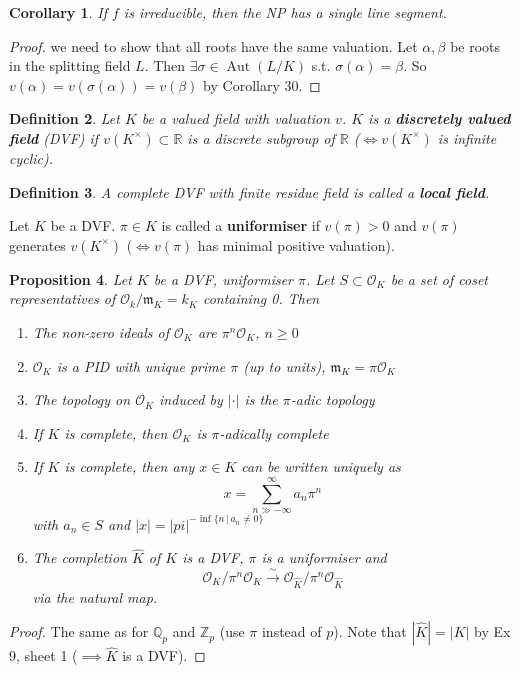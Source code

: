\documentclass[a4paper]{article}
\newtheorem{definition}{Definition}
\newtheorem{prop}[definition]{Proposition}
\newtheorem{corollary}[definition]{Corollary}
\newcommand*\abs[1]{\left|#1\right|}
\DeclareMathOperator{\Aut}{Aut}
\begin{document}
\begin{corollary}
	If $f$ is irreducible, then the NP has a single line segment.
\end{corollary}
\begin{proof}
	we need to show that all roots have the same valuation. Let $\alpha, \beta$ be roots in the splitting field $L$. Then $\exists \sigma \in \Aut(L/K)$ s.t. $\sigma(\alpha) = \beta$. So $v(\alpha)=v(\sigma(\alpha))=v(\beta)$ by Corollary 30.
\end{proof}

\begin{definition}
	Let $K$ be a valued field with valuation $v$. $K$ is a \textbf{discretely valued field} (DVF) if $v(K^\times)\subset \mathbb{R}$ is a discrete subgroup of $\mathbb{R}$ ($\iff v(K^\times)$ is infinite cyclic).
\end{definition}

\begin{definition}
	A complete DVF with finite residue field is called a \textbf{local field}.
\end{definition}

Let $K$ be a DVF. $\pi \in K$ is called a \textbf{uniformiser} if $v(\pi) > 0$ and $v(\pi)$ generates $v(K^\times)$ ($\iff v(\pi)$ has minimal positive valuation).

\begin{prop}
	Let $K$ be a DVF, uniformiser $\pi$. Let $S \subset \mathcal{O}_K$ be a set of coset representatives of $\mathcal{O}_k/\mathfrak{m}_K = k_K$ containing 0. Then
	\begin{enumerate}
		\item The non-zero ideals of $\mathcal{O}_K$ are $\pi^n\mathcal{O}_K$, $n \geq 0$
		\item $\mathcal{O}_K$ is a PID with unique prime $\pi$ (up to units), $\mathfrak{m}_K=\pi\mathcal{O}_K$
		\item The topology on $\mathcal{O}_K$ induced by $\abs{\cdot}$ is the $\pi$-adic topology
		\item If $K$ is complete, then $\mathcal{O}_K$ is $\pi$-adically complete
		\item If $K$ is complete, then any $x \in K$ can be written uniquely as
		$$ x = \sum_{n \gg -\infty}^{\infty} a_n \pi^n$$
		with $a_n \in S$ and $\abs{x} = \abs{pi}^{-\inf\{n \,|\, a_n \neq 0\}}$
		\item The completion $\hat{K}$ of $K$ is a DVF, $\pi$ is a uniformiser and 
		$$\mathcal{O}_K/\pi^n\mathcal{O}_K \overset{\sim}{\longrightarrow} \mathcal{O}_{\hat{K}}/\pi^n\mathcal{O}_{\hat{K}}$$
		via the natural map.
	\end{enumerate}
\end{prop}
\begin{proof}
	The same as for $\mathbb{Q}_p$ and $\mathbb{Z}_p$ (use $\pi$ instead of $p$). 
	Note that $\abs{\hat{K}} = \abs{K}$ by Ex 9, sheet 1 ($\implies \hat{K}$ is a DVF).
\end{proof}
\end{document}
